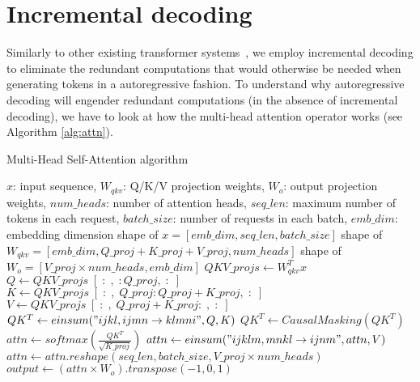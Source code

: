 \section{Incremental decoding}
Similarly to other existing transformer systems~\cite{fairseq, orca}, we employ incremental decoding to eliminate the redundant computations that would otherwise be needed when generating tokens in a autoregressive fashion. To understand why autoregressive decoding will engender redundant computations (in the absence of incremental decoding), we have to look at how the multi-head attention operator works (see Algorithm \ref{alg:attn}). 
\begin{algorithm}[H]
  \caption{Multi-Head Self-Attention algorithm}
  \label{alg:attn}
  \small
  \begin{algorithmic}[1]
    \Ensure $x$: input sequence, $W_{qkv}$: Q/K/V projection weights, $W_{o}$: output projection weights, $num\_heads$: number of attention heads,  $seq\_len$: maximum number of tokens in each request, $batch\_size$: number of requests in each batch, $emb\_dim$: embedding dimension
    \Require shape of $x = [emb\_dim, seq\_len, batch\_size]$
    \Require shape of $W_{qkv} = [emb\_dim, Q\_proj + K\_proj + V\_proj, num\_heads]$
    \Require shape of $W_{o} = [V\_proj \times num\_heads, emb\_dim]$
    \State $QKV\_projs \leftarrow W_{qkv}^Tx$
    \State $Q \leftarrow QKV\_projs \; [\; : \;, \; : Q\_proj, \; : \;]$  
    \State $K \leftarrow QKV\_projs \; [\; : \;, \; Q\_proj : Q\_proj + K\_proj, \; : \;]$ 
    \State $V \leftarrow QKV\_projs \; [\; : \;, \; Q\_proj + K\_proj : \;, \; : \;]$ 
    \State $QK^T \leftarrow einsum("ijkl,ijmn\rightarrow klmni",Q,K)$ 
    \State $QK^T \leftarrow CausalMasking(QK^T)$
    \State $attn \leftarrow softmax(\frac{QK^T}{\sqrt{K\_proj}})$
    \State $attn \leftarrow einsum("ijklm,mnkl \rightarrow ijnm", attn, V)$
    \State $attn \leftarrow attn.reshape(seq\_len, batch\_size, V\_proj \times num\_heads)$
    \State $output \leftarrow (attn \times W_{o}).transpose(-1,0,1)$
  \end{algorithmic}
\end{algorithm}
